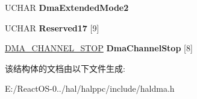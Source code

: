 \begin{DoxyCompactItemize}
\mbox{\label{struct___e_i_s_a___c_o_n_t_r_o_l_a219b930bec99696074b2074e3955e9e9}} 
U\+C\+H\+AR {\bfseries Dma\+Extended\+Mode2}
\item 
\mbox{\label{struct___e_i_s_a___c_o_n_t_r_o_l_a7d14f177f863f5f17b009d01498324a0}} 
U\+C\+H\+AR {\bfseries Reserved17} \mbox{[}9\mbox{]}
\item 
\mbox{\label{struct___e_i_s_a___c_o_n_t_r_o_l_a0e5f23901769ebe3531c54ee1033d6e0}} 
\hyperlink{struct___d_m_a___c_h_a_n_n_e_l___s_t_o_p}{D\+M\+A\+\_\+\+C\+H\+A\+N\+N\+E\+L\+\_\+\+S\+T\+OP} {\bfseries Dma\+Channel\+Stop} \mbox{[}8\mbox{]}
\end{DoxyCompactItemize}


该结构体的文档由以下文件生成\+:\begin{DoxyCompactItemize}
\item 
E\+:/\+React\+O\+S-\/0../hal/halppc/include/haldma.\+h\end{DoxyCompactItemize}
